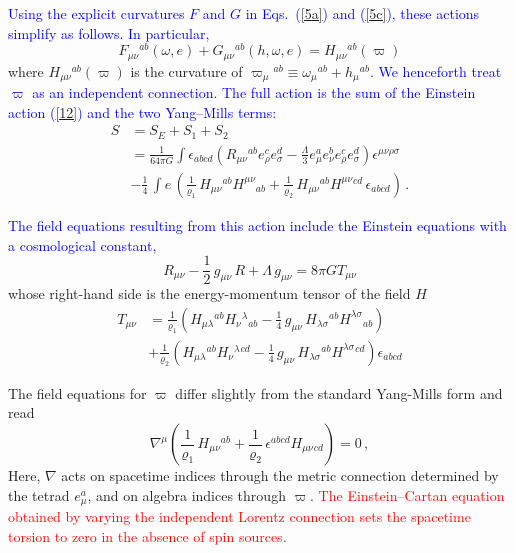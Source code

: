 \documentclass [prd,reprint,eqsecnum,nofootinbib]  {revtex4-1}
\newcommand{\lang}[1]{\textcolor{blue}{#1}}
\newcommand{\science}[1]{\textcolor{red}{#1}}
\begin{document}
\lang{Using the explicit curvatures $F$ and $G$ in Eqs.~(\ref{5a})
and (\ref{5c}), these actions simplify as follows. In particular,}
$$
F_{\mu\nu}{}^{ab}(\omega, e) + G_{\mu\nu}{}^{ab}(h,\omega,e) =
H_{\mu\nu}{}^{ab}(\varpi)
$$
where $H_{\mu\nu}{}^{ab}(\varpi)$ is the curvature of
$\varpi_{\mu}{}^{ab}\equiv\omega_{\mu}{}^{ab}+h_{\mu}{}^{ab}$.
\lang{We henceforth treat $\varpi$ as an independent connection. The
full action is the sum of the Einstein action (\ref{12}) and the two
Yang--Mills terms:}
\begin{align}
S &= S_E + S_1 +S_2 \nonumber\\
&=\frac{1}{64\pi
G}\int\epsilon_{abcd}\left(R_{\mu\nu}{}^{ab}e_{\rho}^{c}e_{\sigma}^{d}
-\frac{\Lambda}{3}e_{\mu}^{a}e_{\nu}^{b}e_{\rho}^{ c}e_{\sigma}^{
d}\right)\epsilon^{\mu\nu\rho\sigma}\nonumber\\
&-\frac14\,\int  e\, \left(\frac1{\varrho_1}\, H_{\mu\nu}{}^{ab}
H^{\mu\nu}{}_{ab}+ \frac1{\varrho_2}\,H_{\mu\nu}{}^{ab}
H^{\mu\nu}{}^{cd}\,\epsilon_{abcd}\right)\, .\label{14}
\end{align}

\lang{The field equations resulting from this action include the
Einstein equations with a cosmological constant,}
\begin{equation}\label{15a}
    R_{\mu\nu}-\frac12\, g_{\mu\nu}\, R +\Lambda\, g_{\mu\nu}= 8\pi G T_{\mu\nu}
\end{equation}
whose right-hand side is the energy-momentum tensor of the field
$H$
\begin{align}
    T_{\mu\nu} &= \frac{1}{\varrho_1}\left(H_{\mu\lambda}{}^{ab} H_\nu{}^\lambda{}_{ab} -
    \frac14\, g_{\mu\nu}\,H_{\lambda\sigma}{}^{ab}
    H^{\lambda\sigma}{}_{ab}\right) \nonumber\\
    &+\frac{1}{\varrho_2}\left(H_{\mu\lambda}{}^{ab} H_\nu{}^\lambda{}^{cd} -
    \frac14\, g_{\mu\nu}\,H_{\lambda\sigma}{}^{ab}
    H^{\lambda\sigma}{}^{cd}\right)\epsilon_{abcd}\label{15}
\end{align}


The field equations for $\varpi$ differ slightly from the standard
Yang-Mills form and read
\begin{equation}\label{16}
    \nabla^\mu \left(\frac1{\varrho_1}\, H_{\mu\nu}{}^{ab} +\frac1{\varrho_2}\,\epsilon^{abcd}
    H_{\mu\nu}{}_{cd}\right)=0\,,
\end{equation}
Here, $\nabla$ acts on spacetime indices through the metric
connection determined by the tetrad $e^a_\mu$, and on algebra
indices through $\varpi$. \science{The Einstein--Cartan equation
obtained by varying the independent Lorentz connection sets the
spacetime torsion to zero in the absence of spin sources.}
\end{document}
